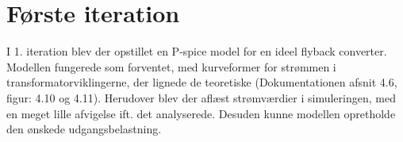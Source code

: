 
\section{Første iteration}
I 1. iteration blev der opstillet en P-spice model for en ideel flyback converter. Modellen fungerede som forventet, med kurveformer for strømmen i transformatorviklingerne, der lignede de teoretiske (Dokumentationen afsnit 4.6, figur: 4.10 og 4.11). Herudover blev der aflæst strømværdier i simuleringen, med en meget lille afvigelse ift. det analyserede. Desuden kunne modellen opretholde den ønskede udgangsbelastning. 